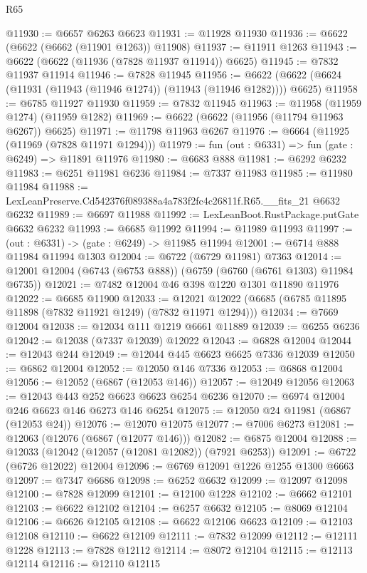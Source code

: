 \begin{lexlean}{R65}
\begin{coremodule}
{@11930 := @6657 @6263 @6623
@11931 := @11928 @11930
@11936 := @6622 (@6622 (@6662 (@11901 @1263)) @11908)
@11937 := @11911 @1263
@11943 := @6622 (@6622 (@11936 (@7828 @11937 @11914)) @6625)
@11945 := @7832 @11937 @11914
@11946 := @7828 @11945
@11956 := @6622 (@6622 (@6624 (@11931 (@11943 (@11946 @1274)) (@11943 (@11946 @1282)))) @6625)
@11958 := @6785 @11927 @11930
@11959 := @7832 @11945
@11963 := @11958 (@11959 @1274) (@11959 @1282)
@11969 := @6622 (@6622 (@11956 (@11794 @11963 @6267)) @6625)
@11971 := @11798 @11963 @6267
@11976 := @6664 (@11925 (@11969 (@7828 @11971 @1294)))
@11979 := fun (out : @6331) => fun (gate : @6249) => @11891 @11976
@11980 := @6683 @888
@11981 := @6292 @6232
@11983 := @6251 @11981 @6236
@11984 := @7337 @11983
@11985 := @11980 @11984
@11988 := LexLeanPreserve.Cd542376f089388a4a783f2fc4c26811f.R65.__fits_21 @6632 @6232
@11989 := @6697 @11988
@11992 := LexLeanBoot.RustPackage.putGate @6632 @6232
@11993 := @6685 @11992
@11994 := @11989 @11993
@11997 := (out : @6331) -> (gate : @6249) -> @11985 @11994
@12001 := @6714 @888 @11984 @11994 @1303
@12004 := @6722 (@6729 @11981) @7363
@12014 := @12001 @12004 (@6743 (@6753 @888)) (@6759 (@6760 (@6761 @1303) @11984 @6735))
@12021 := @7482 @12004 @46 @398 @1220 @1301 @11890 @11976
@12022 := @6685 @11900
@12033 := @12021 @12022 (@6685 (@6785 @11895 @11898 (@7832 @11921 @1249) (@7832 @11971 @1294)))
@12034 := @7669 @12004
@12038 := @12034 @111 @1219 @6661 @11889
@12039 := @6255 @6236
@12042 := @12038 (@7337 @12039) @12022
@12043 := @6828 @12004
@12044 := @12043 @244
@12049 := @12044 @445 @6623 @6625 @7336 @12039
@12050 := @6862 @12004
@12052 := @12050 @146 @7336
@12053 := @6868 @12004
@12056 := @12052 (@6867 (@12053 @146))
@12057 := @12049 @12056
@12063 := @12043 @443 @252 @6623 @6623 @6254 @6236
@12070 := @6974 @12004 @246 @6623 @146 @6273 @146 @6254
@12075 := @12050 @24 @11981 (@6867 (@12053 @24))
@12076 := @12070 @12075
@12077 := @7006 @6273
@12081 := @12063 (@12076 (@6867 (@12077 @146)))
@12082 := @6875 @12004
@12088 := @12033 (@12042 (@12057 (@12081 @12082)) (@7921 @6253))
@12091 := @6722 (@6726 @12022) @12004
@12096 := @6769 @12091 @1226 @1255 @1300 @6663
@12097 := @7347 @6686
@12098 := @6252 @6632
@12099 := @12097 @12098
@12100 := @7828 @12099
@12101 := @12100 @1228
@12102 := @6662 @12101
@12103 := @6622 @12102
@12104 := @6257 @6632
@12105 := @8069 @12104
@12106 := @6626 @12105
@12108 := @6622 @12106 @6623
@12109 := @12103 @12108
@12110 := @6622 @12109
@12111 := @7832 @12099
@12112 := @12111 @1228
@12113 := @7828 @12112
@12114 := @8072 @12104
@12115 := @12113 @12114
@12116 := @12110 @12115
}
\end{coremodule}
\end{lexlean}
